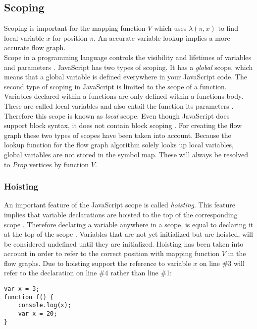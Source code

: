 \documentclass[journal,10pt]{IEEEtran} %
\begin{document}
\subsection{Scoping}
Scoping is important for the mapping function $V$ which uses $\lambda(\pi, x)$ to find local variable $x$ for position $\pi$. An accurate variable lookup implies a more accurate flow graph. \\ %
Scope in a programming language controls the visibility and lifetimes of variables and parameters \cite[p. 36]{Crockford:2008:JGP}. JavaScript has two types of scoping. It has a \textit{global} scope, which means that a global variable is defined everywhere in your JavaScript code. The second type of scoping in JavaScript is limited to the scope of a function. Variables declared within a functions are only defined within a functions body. These are called local variables and also entail the function its parameters \cite[p.53]{flanagan2011javascript}. Therefore this scope is known as \textit{local} scope. Even though JavaScript does support block syntax, it does not contain block scoping \cite[p. 36]{Crockford:2008:JGP}.
For creating the flow graph these two types of scopes have been taken into account. Because the lookup function for the flow graph algorithm solely looks up local variables, global variables are not stored in the symbol map. These will always be resolved to \textit{Prop} vertices by function $V$.

\subsubsection{Hoisting}
An important feature of the JavaScript scope is called \textit{hoisting}. This feature implies that variable declarations are hoisted to the top of the corresponding scope \cite[p. 54]{flanagan2011javascript}. Therefore declaring a variable anywhere in a scope, is equal to declaring it at the top of the scope \cite{mozillavarspecs}. Variables that are not yet initialized but are hoisted, will be considered undefined until they are initialized. Hoisting has been taken into account in order to refer to the correct position with mapping function $V$ in the flow graphs. Due to hoisting support the reference to variable $x$ on line \#3 will refer to the declaration on line \#4 rather than line \#1:
\vskip 6pt
\begin{verbatim}
var x = 3;
function f() {
    console.log(x);
    var x = 20;
}
\end{verbatim}
\vskip 6pt
\end{document}
